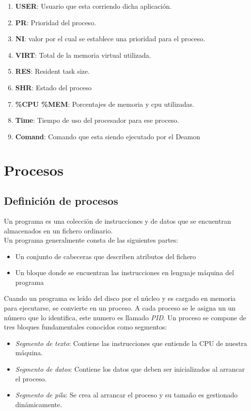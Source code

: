 \documentclass{article}
\begin{document}
\begin{enumerate}
	\item \textbf{USER}: Usuario que esta corriendo dicha aplicación.
	\item \textbf{PR}: Prioridad del proceso.
	\item \textbf{NI}: valor por el cual se establece una prioridad para el proceso.
	\item \textbf{VIRT}: Total de la memoria virtual utilizada.
	\item \textbf{RES}: Resident task size.
	\item \textbf{SHR}: Estado del proceso
	\item \textbf{\%CPU \%MEM}: Porcentajes de memoria y cpu utilizadas.
	\item \textbf{Time}: Tiempo de uso del procesador para ese proceso.
	\item \textbf{Comand}: Comando que esta siendo ejecutado por el Deamon
	\end{enumerate}
	\section{Procesos}
	\subsection{Definición de procesos}
	Un programa es una colección de instrucciones y de datos que se encuentran almacenados en un fichero ordinario.\\Un programa generalmente consta de las siguientes partes:
	\begin{itemize}
		\item Un conjunto de cabeceras que describen atributos del fichero
		\item Un bloque donde se encuentran las instrucciones en lenguaje máquina del programa
	\end{itemize}
	
	Cuando un programa es leído del disco por el núcleo y es cargado en memoria para ejecutarse, se convierte en un proceso. A cada proceso se le asigna un un número que lo identifica, este numero es llamado \textit{PID}. Un proceso se compone de tres bloques fundamentales conocidos como segmentos:\\
	\begin{itemize}
		\item  \textit{Segmento de texto}: Contiene las instrucciones que entiende la CPU de nuestra máquina.
		\item \textit{Segmento de datos}: Contiene los datos que deben ser inicializados al arrancar el proceso.
		\item \textit{Segmento de pila}: Se crea al arrancar el proceso y su tamaño es gestionado dinámicamente.
 	\end{itemize}
	
\end{document}
